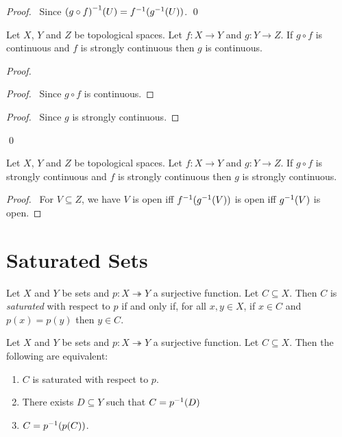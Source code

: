 \begin{proof}
    \pf\ Since ${(g \circ f)}^{-1}(U) = {f}^{-1}({g}^{-1}(U))$. \qed
\end{proof}

\begin{proposition}
    \label{proposition:continuous_strongly_continuous}
    Let $X$, $Y$ and $Z$ be topological spaces.
    Let $f : X \rightarrow Y$ and $g : Y \rightarrow Z$.
    If $g \circ f$ is continuous and $f$ is strongly continuous then 
    $g$ is continuous.
\end{proposition}

\begin{proof}
    \pf
    \begin{proof}
        \pf\ Since $g \circ f$ is continuous.
    \end{proof}
    \begin{proof}
        \pf\ Since $g$ is strongly continuous.
    \end{proof}
    \qed
\end{proof}

\begin{proposition}
    \label{proposition:strongly_continuous_strongly_continuous}
    Let $X$, $Y$ and $Z$ be topological spaces.
    Let $f : X \rightarrow Y$ and $g : Y \rightarrow Z$.
    If $g \circ f$ is strongly continuous and $f$ is strongly continuous then 
    $g$ is strongly continuous.
\end{proposition}

\begin{proof}
    \pf\ For $V \subseteq Z$, we have $V$ is open iff ${f}^{-1}({g}^{-1}(V))$ is
    open iff ${g}^{-1}(V)$ is open.
\end{proof}

\section{Saturated Sets}

\begin{definition}
    Let $X$ and $Y$ be sets and $p : X \twoheadrightarrow Y$ a surjective function. Let $C \subseteq X$. Then $C$ is \emph{saturated} with respect to $p$ if and only if, for all
    $x, y \in X$, if $x \in C$ and $p(x) = p(y)$ then $y \in C$.
\end{definition}

\begin{proposition}
    \label{proposition:saturated}
    Let $X$ and $Y$ be sets and $p : X \twoheadrightarrow Y$ a surjective function. Let $C \subseteq X$. Then the following are equivalent:
    \begin{enumerate}
        \item $C$ is saturated with respect to $p$.
        \item There exists $D \subseteq Y$ such that $C = {p}^{-1}(D)$
        \item $C = {p}^{-1}(p(C))$.
    \end{enumerate}
\end{proposition}

